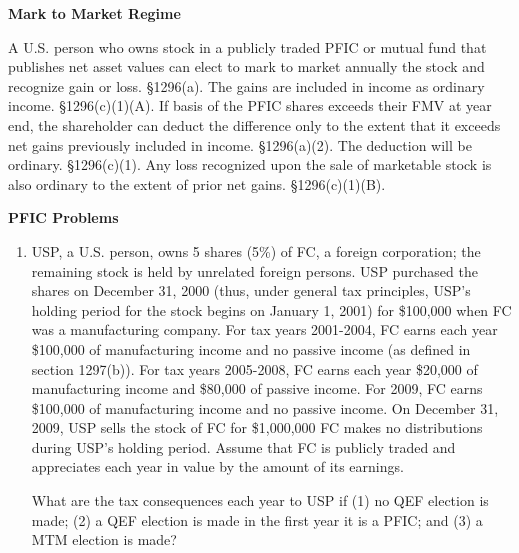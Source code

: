 	       \begin{center}
	       \textbf{Mark to Market Regime} 
	          	\end{center}
	       A U.S. person who owns stock in a publicly traded PFIC or mutual fund that publishes net asset values can elect to mark to market annually the stock and recognize gain or loss.  \S 1296(a).  The gains are included in income as ordinary income.  \S1296(c)(1)(A).  If basis of the PFIC shares exceeds their FMV at year end, the shareholder can deduct the difference only to the extent that it exceeds net gains previously included in income.  \S1296(a)(2).  The deduction will be ordinary.  \S1296(c)(1).  Any loss recognized upon the sale of marketable stock is also ordinary to the extent of prior net gains.  \S1296(c)(1)(B).
	       
	\begin{center}
		\textbf{PFIC Problems}
	\end{center}
	\begin{select}
	
			\begin{enumerate}
	
	\item   USP, a U.S. person, owns 5 shares (5\%) of FC, a foreign corporation; the remaining stock is held by unrelated foreign persons.  USP purchased the shares on December 31, 2000 (thus, under general tax principles, USP's holding period for the stock begins on January 1, 2001) for \$100,000 when FC was a manufacturing company.  For tax years 2001-2004, FC earns each year \$100,000 of manufacturing income and no passive income (as defined in section 1297(b)).  For tax years 2005-2008, FC earns each year \$20,000 of manufacturing income and \$80,000 of passive income.  For 2009, FC earns \$100,000 of manufacturing income and no passive income.  On December 31, 2009, USP sells the stock of FC for \$1,000,000  FC makes no distributions during USP's holding period.  Assume that FC is publicly traded and appreciates each year in value by the amount of its earnings.
	
	What are the tax consequences each year to USP if (1) no QEF election is made; (2) a QEF election is made in the first year it is a PFIC; and (3) a MTM election is made?
	
	
	\end{enumerate}
	\end{select}
 